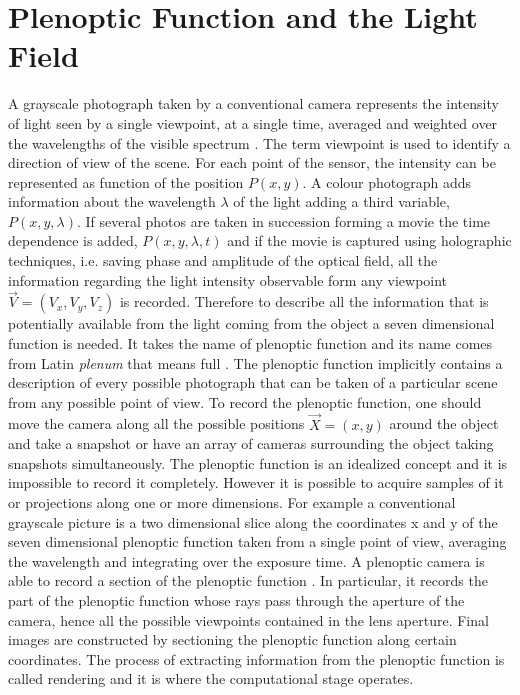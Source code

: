 \section{Plenoptic Function and the Light Field}
\label{sec:lightfield}
A grayscale photograph taken by a conventional camera represents the intensity of light seen by a single viewpoint, at a single time, averaged and weighted over the wavelengths of the visible spectrum \cite{adelson1991plenoptic}. The term viewpoint is used to identify a direction of view of the scene. For each point of the sensor, the intensity can be represented as function of the position $P(x,y)$. A colour photograph adds information about the wavelength $\lambda$ of the light adding a third variable, $P(x,y,\lambda)$. If several photos are taken in succession forming a movie the time dependence is added, $P(x,y,\lambda,t)$ and if the movie is captured using holographic techniques, i.e. saving phase and amplitude of the optical field, all the information regarding the light intensity observable form any viewpoint $\overrightarrow{V} = (V_x, V_y, V_z)$ is recorded. Therefore to describe all the information that is potentially available from the light coming from the object a seven dimensional function is needed. It takes the name of plenoptic function and its name comes from Latin \textit{plenum} that means full \cite{adelson1992single, adelson1991plenoptic,wetzstein2011computational}. The plenoptic function implicitly contains a description of every possible photograph that can be taken of a particular scene from any possible point of view. To record the plenoptic function, one should move the camera along all the possible positions $\overrightarrow{X}=(x, y)$ around the object and take a snapshot or have an array of cameras surrounding the object taking snapshots simultaneously. The plenoptic function is an idealized concept and it is impossible to record it completely. However it is possible to acquire samples of it or projections along one or more dimensions. For example a conventional grayscale picture is a two dimensional slice along the coordinates x and y of the seven dimensional plenoptic function taken from a single point of view, averaging the wavelength and integrating over the exposure time. A plenoptic camera is able to record a section of the plenoptic function \cite{adelson1991plenoptic}. In particular, it records the part of the plenoptic function whose rays pass through the aperture of the camera, hence all the possible viewpoints contained in the lens aperture. Final images are constructed by sectioning the plenoptic function along certain coordinates. The process of extracting information from the plenoptic function is called rendering \cite{levoy1996light,georgiev2010focused} and it is where the computational stage operates. 
